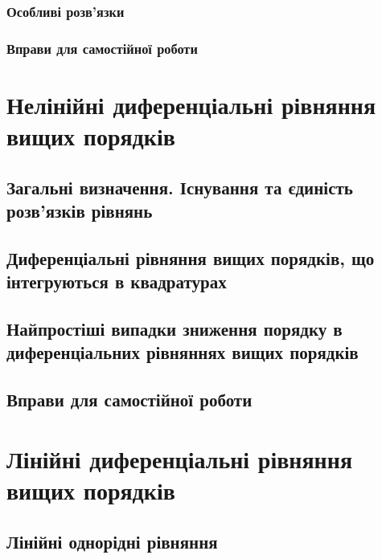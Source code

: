 		\subsubsection{Особливі розв’язки}
		

		\subsubsection{Вправи для самостійної роботи}
		

\section{Нелінійні диференціальні рівняння вищих порядків}


	\subsection{Загальні визначення. Існування та єдиність роз\-в’я\-з\-ків рівнянь}
	

	\subsection{Диференціальні рівняння вищих порядків, що інтегруються в квадратурах}
	

	\subsection{Найпростіші випадки зниження порядку в диференціальних рівняннях вищих порядків}
	

	\subsection{Вправи для самостійної роботи}
	

\section{Лі\-ній\-ні ди\-фе\-рен\-ці\-аль\-ні рів\-ня\-н\-ня ви\-щих \allowbreak по\-ряд\-ків}


	\subsection{Лінійні однорідні рівняння}
	

